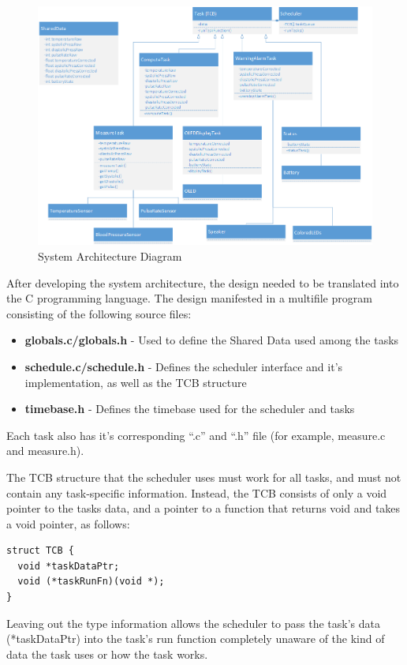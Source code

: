 \documentclass[12pt]{article} %
\begin{document}
\begin{figure}
    \centering
    \includegraphics[width=\textwidth]{../design/System_Architecture}
    \caption{System Architecture Diagram}
    \label{fig:arch}
\end{figure}

After developing the system architecture, the design needed to be translated into the C programming language.  The design manifested in a multifile program consisting of the following source files:
\begin{itemize}
  \item \textbf{globals.c/globals.h} - Used to define the Shared Data used among the tasks
  \item \textbf{schedule.c/schedule.h} - Defines the scheduler interface and it's implementation, as well as the TCB structure
  \item \textbf{timebase.h} - Defines the timebase used for the scheduler and tasks
\end{itemize}
Each task also has it's corresponding ``.c'' and ``.h'' file (for example, measure.c and measure.h).

The TCB structure that the scheduler uses must work for all tasks, and must not
contain any task-specific information.  Instead, the TCB consists of only a void pointer to the tasks data, and a pointer to a function that returns void and takes a void pointer, as follows:
\begin{lstlisting}
struct TCB {
  void *taskDataPtr;
  void (*taskRunFn)(void *);
}
\end{lstlisting}
Leaving out the type information allows the scheduler to pass the task's data
(*taskDataPtr) into the task's run function completely unaware of the kind of
data the task uses or how the task works.
\end{document}
